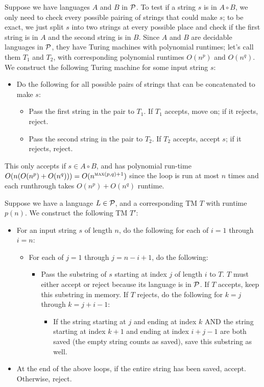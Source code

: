 \documentclass[solution, letterpaper]{cs121}
\begin{document}
\begin{solution}
\subsolution Suppose we have languages $A$ and $B$ in ${\cal P}$.  To test if a string $s$ is in $A \circ B$, we only need to check every possible pairing of strings that could make $s$; to be exact, we just split $s$ into two strings at every possible place and check if the first string is in $A$ and the second string is in $B$.  Since $A$ and $B$ are decidable languages in ${\cal P}$, they have Turing machines with polynomial runtimes; let's call them $T_1$ and $T_2$, with corresponding polynomial runtimes $O(n^p)$ and $O(n^q)$.  We construct the following Turing machine for some input string $s$:
\begin{itemize}
	\setlength\itemsep{0cm}
	\item Do the following for all possible pairs of strings that can be concatenated to make $s$:
	\begin{itemize}
		\item Pass the first string in the pair to $T_1$.  If $T_1$ accepts, move on; if it rejects, reject.
		\item Pass the second string in the pair to $T_2$.  If $T_2$ accepts, accept $s$; if it rejects, reject.
	\end{itemize}
\end{itemize}

This only accepts if $s \in A \circ B$, and has polynomial run-time $O(n(O(n^p)+O(n^q))) = O(n^{\textsc{max}(p,q)+1})$ since the loop is run at most $n$ times and each runthrough takes $O(n^p)+O(n^q)$ runtime.

\subsolution Suppose we have a language $L \in {\cal P}$, and a corresponding TM $T$ with runtime $p(n)$.  We construct the following TM $T'$: 
\begin{itemize}
	\setlength\itemsep{0cm}
	\item For an input string $s$ of length $n$, do the following for each of $i = 1$ through $i = n$:
	\begin{itemize}
		\item For each of $j = 1$ through $j = n - i + 1$, do the following:
		\begin{itemize}
			\item Pass the substring of $s$ starting at index $j$ of length $i$ to $T$.  $T$ must either accept or reject because its language is in ${\cal P}$.  If $T$ accepts, keep this substring in memory.  If $T$ rejects, do the following for $k = j$ through $k = j + i - 1$:
			\begin{itemize}
				\item If the string starting at $j$ and ending at index $k$ AND the string starting at index $k+1$ and ending at index $i + j - 1$ are both saved (the empty string counts as saved), save this substring as well.
			\end{itemize}
		\end{itemize}
	\end{itemize}
	\item At the end of the above loops, if the entire string has been saved, accept.  Otherwise, reject.
\end{itemize}


\end{solution}
\end{document}
